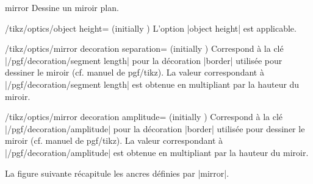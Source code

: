 \documentclass[a4paper]{ltxdoc}
\begin{document}
\begin{shape}{mirror}
Dessine un miroir plan.

\begin{codeexample}[width=6cm]
\end{codeexample}

\begin{key}{/tikz/optics/object height= (initially )}
    L'option |object height| est applicable.
\end{key}

\begin{key}{/tikz/optics/mirror decoration separation= (initially )}
Correspond à la clé |/pgf/decoration/segment length| pour la décoration |border| utilisée pour dessiner le miroir (cf. manuel de pgf/tikz). 
La valeur correspondant à |/pgf/decoration/segment length| est obtenue en multipliant  par la hauteur du miroir.
\end{key}

\begin{key}{/tikz/optics/mirror decoration amplitude= (initially )}
Correspond à la clé |/pgf/decoration/amplitude| pour la décoration |border| utilisée pour dessiner le miroir (cf. manuel de pgf/tikz).
La valeur correspondant à |/pgf/decoration/amplitude| est obtenue en multipliant  par la hauteur du miroir.
\end{key}


La figure suivante récapitule les ancres définies par |mirror|.

\begin{codeexample}[]
\Huge
{}
\end{codeexample}

\end{shape}
\end{document}
